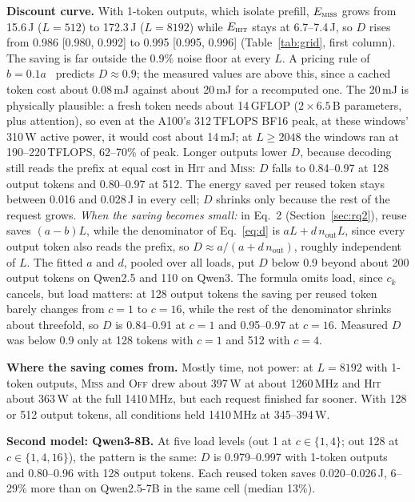 \documentclass[conference]{IEEEtran}
\begin{document}
\textbf{Discount curve.} With 1-token outputs, which isolate prefill, $E_{\textsc{miss}}$ grows from 15.6\,J ($L{=}512$) to 172.3\,J ($L{=}8192$) while $E_{\textsc{hit}}$ stays at 6.7--7.4\,J, so $D$ rises from 0.986 [0.980, 0.992] to 0.995 [0.995, 0.996] (Table~\ref{tab:grid}, first column). The saving is far outside the 0.9\% noise floor at every $L$. A pricing rule of $b=0.1a$~\cite{openai,anthropic} predicts $D\approx0.9$; the measured values are above this, since a cached token cost about 0.08\,mJ against about 20\,mJ for a recomputed one. The 20\,mJ is physically plausible: a fresh token needs about 14\,GFLOP ($2\times6.5$\,B parameters, plus attention), so even at the A100's 312\,TFLOPS BF16 peak, at these windows' 310\,W active power, it would cost about 14\,mJ; at $L\ge2048$ the windows ran at 190--220\,TFLOPS, 62--70\% of peak. Longer outputs lower $D$, because decoding still reads the prefix at equal cost in \textsc{Hit} and \textsc{Miss}: $D$ falls to 0.84--0.97 at 128 output tokens and 0.80--0.97 at 512. The energy saved per reused token stays between 0.016 and 0.028\,J in every cell; $D$ shrinks only because the rest of the request grows. \emph{When the saving becomes small:} in Eq.~2 (Section~\ref{sec:rq2}), reuse saves $(a-b)L$, while the denominator of Eq.~\ref{eq:d} is $aL + d\,n_{\text{out}}L$, since every output token also reads the prefix, so $D\approx a/(a+d\,n_{\text{out}})$, roughly independent of $L$. The fitted $a$ and $d$, pooled over all loads, put $D$ below 0.9 beyond about 200 output tokens on Qwen2.5 and 110 on Qwen3. The formula omits load, since $c_k$ cancels, but load matters: at 128 output tokens the saving per reused token barely changes from $c{=}1$ to $c{=}16$, while the rest of the denominator shrinks about threefold, so $D$ is 0.84--0.91 at $c{=}1$ and 0.95--0.97 at $c{=}16$. Measured $D$ was below 0.9 only at 128 tokens with $c{=}1$ and 512 with $c{=}4$.

\textbf{Where the saving comes from.} Mostly time, not power: at $L{=}8192$ with 1-token outputs, \textsc{Miss} and \textsc{Off} drew about 397\,W at about 1260\,MHz and \textsc{Hit} about 363\,W at the full 1410\,MHz, but each request finished far sooner. With 128 or 512 output tokens, all conditions held 1410\,MHz at 345--394\,W.

\textbf{Second model: Qwen3-8B.} At five load levels (out 1 at $c\in\{1,4\}$; out 128 at $c\in\{1,4,16\}$), the pattern is the same: $D$ is 0.979--0.997 with 1-token outputs and 0.80--0.96 with 128 output tokens. Each reused token saves 0.020--0.026\,J, 6--29\% more than on Qwen2.5-7B in the same cell (median 13\%).
\end{document}
